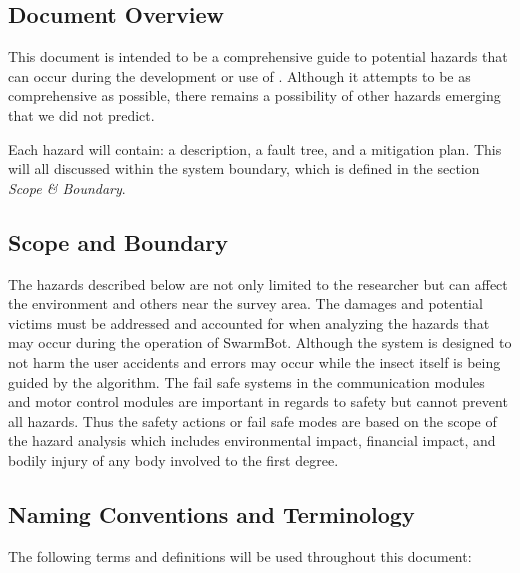 \documentclass[11pt]{article}
\begin{document}
\subsection{Document Overview}

This document is intended to be a comprehensive guide to potential hazards that can occur during the
development or use of \PROJECTNAME. Although it attempts to be as comprehensive as possible, there
remains a possibility of other hazards emerging that we did not predict.

Each hazard will contain: a description, a fault tree, and a mitigation plan. This will all discussed
within the system boundary, which is defined in the section \textit{Scope \& Boundary}.
\subsection{Scope and Boundary}
The hazards described below are not only limited to the researcher but can affect the environment and others near the survey area. The damages and potential victims must be addressed and accounted for when analyzing the hazards that may occur during the operation of SwarmBot. Although the system is designed to not harm the user accidents and errors may occur while the insect itself is being guided by the algorithm. The fail safe systems in the communication modules and motor control modules are important in regards to safety but cannot prevent all hazards. Thus the safety actions or fail safe modes are based on the scope of the hazard analysis which includes environmental impact, financial impact, and bodily injury of any body involved to the first degree. 

\subsection{Naming Conventions and Terminology}
\label{sec:definitions}
The following terms and definitions will be used throughout this document:
\end{document}
